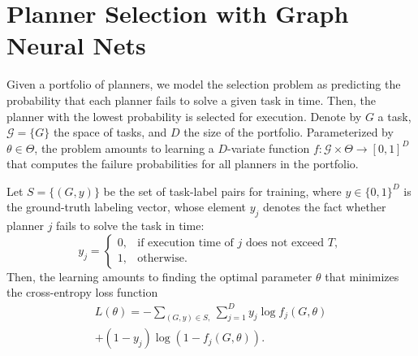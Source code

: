 \documentclass[letterpaper]{article} %
\begin{document}
\section{Planner Selection with Graph Neural Nets}
Given a portfolio of planners, we model the selection problem as predicting the probability that each planner fails to solve a given task in time. Then, the planner with the lowest probability is selected for execution. Denote by $G$ a task, $\mathcal{G}=\{G\}$ the space of tasks, and $D$ the size of the portfolio. Parameterized by $\theta\in\Theta$, the problem amounts to learning a $D$-variate function $f:\mathcal{G}\times\Theta\to[0,1]^D$ that computes the failure probabilities for all planners in the portfolio.

Let $S=\{(G,y)\}$ be the set of task-label pairs for training, where $y\in\{0,1\}^D$ is the ground-truth labeling vector, whose element $y_j$ denotes the fact whether planner $j$ fails to solve the task in time:
\begin{equation}\label{eqn:y}
y_j=\begin{cases}
0, & \text{if execution time of $j$ does not exceed $T$}, \\
1, & \text{otherwise}.
\end{cases}
\end{equation}
Then, the learning amounts to finding the optimal parameter $\theta$ that minimizes the cross-entropy loss function
\begin{multline*}
L(\theta)=-\sum_{(G,y)\in S,}\sum_{j=1}^D y_j\log f_j(G,\theta)\\
+(1-y_j)\log (1-f_j(G,\theta)).
\end{multline*}


\end{document}
